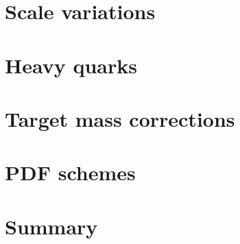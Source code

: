 \section{Scale variations}
\label{sec:sv}


\section{Heavy quarks}
\label{sec:hq}


\section{Target mass corrections}
\label{sec:TMC}


\section{PDF schemes}
\label{sec:schemes}


\section{Summary}
\label{sec:summary}

